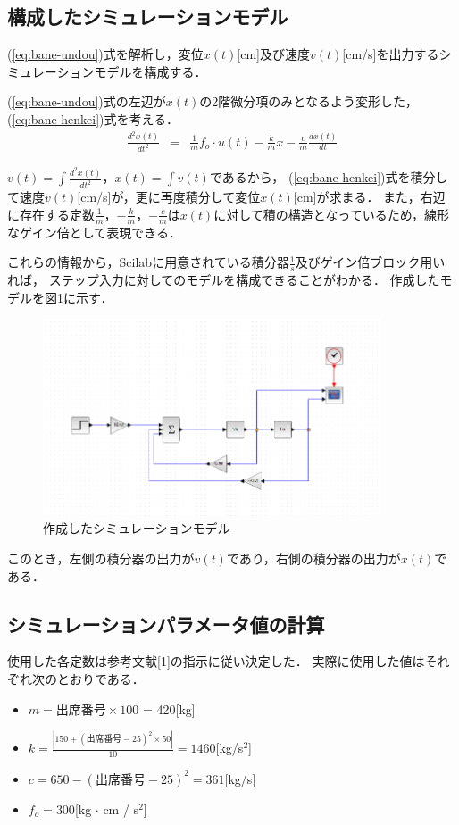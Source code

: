 \documentclass[dvipdfmx,titlepage,a4j]{jsarticle}  %
\begin{document}
\subsection{構成したシミュレーションモデル}

(\ref{eq:bane-undou})式を解析し，変位$x(t)$[cm]及び速度$v(t)$[cm/s]を出力するシミュレーションモデルを構成する．

(\ref{eq:bane-undou})式の左辺が$x(t)$の2階微分項のみとなるよう変形した，(\ref{eq:bane-henkei})式を考える．
\begin{eqnarray}
  \frac{d^2x(t)}{dt^2} &=&  \frac{1}{m} f_o \cdot u(t) - \frac{k}{m} x - \frac{c}{m} \frac{dx(t)}{dt} \label{eq:bane-henkei}
\end{eqnarray}

$v(t) = \int \frac{d^2x(t)}{dt^2}$，$x(t) = \int v(t)$であるから，
(\ref{eq:bane-henkei})式を積分して速度$v(t)$[cm/s]が，更に再度積分して変位$x(t)$[cm]が求まる．
また，右辺に存在する定数$\frac{1}{m}$，$- \frac{k}{m}$，$- \frac{c}{m}$は$x(t)$に対して積の構造となっているため，線形なゲイン倍として表現できる．

これらの情報から，Scilabに用意されている積分器$\frac{1}{s}$及びゲイン倍ブロック用いれば，
ステップ入力に対してのモデルを構成できることがわかる．
作成したモデルを図\ref{fig:bane-model.png}に示す．

\begin{figure}[H]
  \centering
  \includegraphics[width=10cm]{../graph/bane-model.png}
  \caption{作成したシミュレーションモデル}
  \label{fig:bane-model.png}
\end{figure}

このとき，左側の積分器の出力が$v(t)$であり，右側の積分器の出力が$x(t)$である．

\subsection{シミュレーションパラメータ値の計算}
使用した各定数は参考文献[1]の指示に従い決定した．
実際に使用した値はそれぞれ次のとおりである．
\begin{itemize}
  \item $m = 出席番号 \times 100$ = 420[kg]
  \item $k = \frac{|150 + (出席番号 - 25)^2 \times 50|}{10} = 1460$[kg/s$^2$]
  \item $c = 650 - (出席番号 - 25)^2 = 361$[kg/s]
  \item $f_o = 300$[kg $\cdot$ cm / s$^2$]
\end{itemize}
\end{document}

